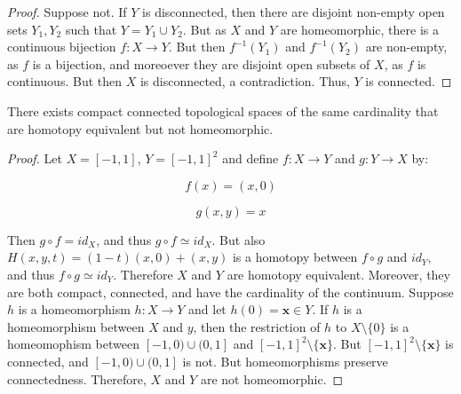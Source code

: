             \begin{proof}
                Suppose not. If $Y$ is disconnected, then there are disjoint
                non-empty open sets $Y_{1},Y_{2}$ such that
                $Y=Y_{1}\cup{Y_{2}}$. But as $X$ and $Y$ are homeomorphic,
                there is a continuous bijection $f:X\rightarrow{Y}$. But then
                $f^{-1}(Y_{1})$ and $f^{-1}(Y_{2})$ are non-empty, as $f$ is a
                bijection, and moreoever they are disjoint open subsets of $X$,
                as $f$ is continuous. But then $X$ is disconnected,
                a contradiction. Thus, $Y$ is connected.
            \end{proof}
            \begin{theorem}
                There exists compact connected topological spaces of the same
                cardinality that are homotopy equivalent but not homeomorphic.
            \end{theorem}
            \begin{proof}
                Let $X=[-1,1]$, $Y=[-1,1]^{2}$ and define
                $f:X\rightarrow{Y}$ and $g:Y\rightarrow{X}$ by:
                \par
                \begin{minipage}[b]{0.49\textwidth}
                    \centering
                    \begin{equation}
                        f(x)=(x,0)
                    \end{equation}
                \end{minipage}
                \hfill
                \begin{minipage}[b]{0.49\textwidth}
                    \centering
                    \begin{equation}
                        g(x,y)=x
                    \end{equation}
                \end{minipage}
                \par\hfill\par
                Then $g\circ{f}=id_{X}$, and thus $g\circ{f}\simeq{id_{X}}$. But
                also $H(x,y,t)=(1-t)(x,0)+(x,y)$ is a homotopy between
                $f\circ{g}$ and $id_{Y}$, and thus $f\circ{g}\simeq{id_{Y}}$.
                Therefore $X$ and $Y$ are homotopy equivalent. Moreover, they
                are both compact, connected, and have the cardinality
                of the continuum. Suppose $h$ is a homeomorphism
                $h:X\rightarrow{Y}$ and let $h(0)=\mathbf{x}\in{Y}$. If $h$ is
                a homeomorphism between $X$ and $y$, then the restriction of $h$
                to $X\setminus\{0\}$ is a homeomophism between $[-1,0)\cup(0,1]$
                and $[-1,1]^{2}\setminus\{\mathbf{x}\}$. But
                $[-1,1]^{2}\setminus\{\mathbf{x}\}$ is connected, and
                $[-1,0)\cup(0,1]$ is not. But homeomorphisms preserve
                connectedness. Therefore, $X$ and $Y$ are not homeomorphic.
            \end{proof}
